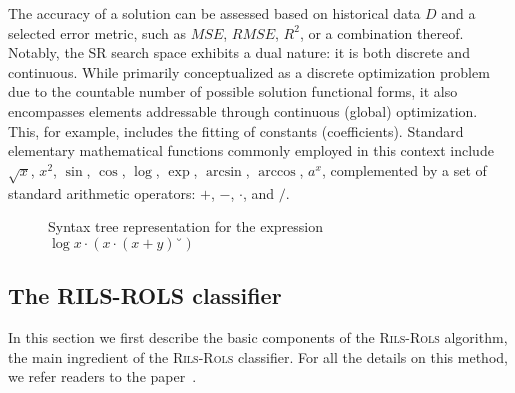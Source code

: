 \documentclass{bmcart}
\begin{document}
The accuracy of a solution can be assessed based on historical data $D$ and a selected error metric, such as $MSE$, $RMSE$, $R^2$, or a combination thereof. Notably, the SR search space exhibits a dual nature: it is both discrete and continuous. While primarily conceptualized as a discrete optimization problem due to the countable number of possible solution functional forms, it also encompasses elements addressable through continuous (global) optimization. This, for example, includes the fitting of constants (coefficients). Standard elementary mathematical functions commonly employed in this context include $\sqrt{x}$, $x^2$, $\sin$, $\cos$, $\log$, $\exp$, $\arcsin$, $\arccos$, $a^x$, complemented by a set of standard arithmetic operators: $+$, $-$, $\cdot$, and $/$.
 
 \begin{figure}[!ht]
 	\centering
 	
 	\caption{Syntax tree representation for the expression $\log{x} \cdot   ( x \cdot ( x + y )˘)$}
 	\label{fig:syntax-tree-example}
 \end{figure}
 

\subsection{The \textsc{RILS}-\textsc{ROLS}  classifier}

In this section we first describe the basic components of the \textsc{Rils}-\textsc{Rols} algorithm, the main ingredient of the \textsc{Rils-Rols} classifier. For all the details on this method, we refer readers to the paper~\cite{kartelj2023rils}. 
\end{document}
